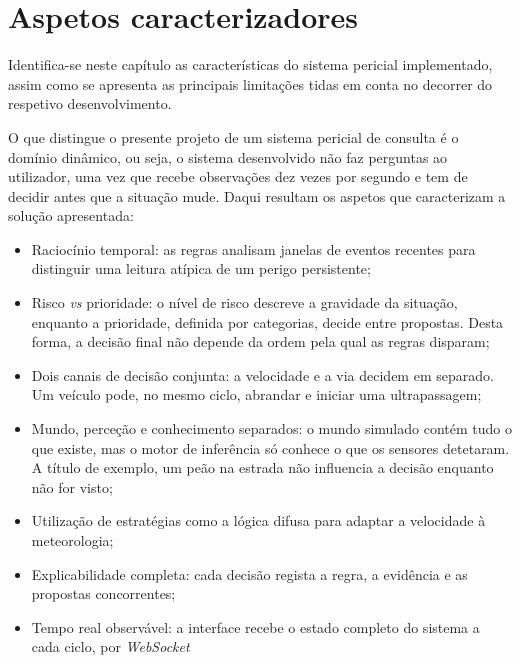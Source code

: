 
\chapter{Aspetos caracterizadores}\label{sec:2}

Identifica-se neste capítulo as características do sistema pericial implementado, assim como se apresenta as principais limitações tidas em conta no decorrer do respetivo desenvolvimento.

O que distingue o presente projeto de um sistema pericial de consulta é o domínio dinâmico, ou seja, o sistema desenvolvido não faz perguntas ao utilizador, uma vez que recebe observações dez vezes por segundo e tem de decidir antes que a situação mude. Daqui resultam os aspetos que caracterizam a solução apresentada:

\begin{itemize}
  \item Raciocínio temporal: as regras analisam janelas de eventos recentes para distinguir uma leitura atípica de um perigo persistente;
  \item Risco \emph{vs} prioridade: o nível de risco descreve a gravidade da situação, enquanto a prioridade, definida por categorias, decide entre propostas. Desta forma, a decisão final não depende da ordem pela qual as regras disparam;
  \item Dois canais de decisão conjunta: a velocidade e a via decidem em separado. Um veículo pode, no mesmo ciclo, abrandar e iniciar uma ultrapassagem;
  \item Mundo, perceção e conhecimento separados: o mundo simulado contém tudo o que existe, mas o motor de inferência só conhece o que os sensores detetaram. A título de exemplo, um peão na estrada não influencia a decisão enquanto não for visto;
  \item Utilização de estratégias como a lógica difusa para adaptar a velocidade à meteorologia;
  \item Explicabilidade completa: cada decisão regista a regra, a evidência e as propostas concorrentes;
  \item Tempo real observável: a interface recebe o estado completo do sistema a cada ciclo, por \emph{WebSocket}
\end{itemize}
